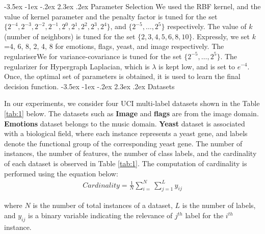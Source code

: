 \documentclass[12pt,a4paper,oneside,english]{report}
\makeatletter
\renewcommand\subsection{\@startsection {subsection}{1}{\z@}%
                                   {-3.5ex \@plus -1ex \@minus -.2ex}%
                                   {2.3ex \@plus.2ex}%
                                   {\centering\normalfont\Large\bfseries}}
\renewcommand{\tabcolsep}{0.5cm}
\renewcommand{\arraystretch}{1.5}
\makeatother
\begin{document}
\subsection{Parameter Selection}
We used the RBF kernel, and the value of kernel parameter and the penalty factor is tuned for the set $\{2^{-4},2^{-3},2^{-2},2^{-1},2^0,2^1,2^2,2^3,2^4\}$, and $\{2^{-5},\ldots,2^5\}$ respectively. The value of $k$ (number of neighbors) is tuned for the set $\{2,3,4,5,6,8,10\}$. Expressly, we set $k$=4, 6, 8, 2, 4, 8 for emotions, flags, yeast, and image  respectively. The regulariserWe for variance-covariance is tuned for the set $\{2^{-5},\ldots,2^5\}$. The regularizer for Hypergraph Laplacian, which is $\lambda$ is kept low, and is set to $e^{-4}$. Once, the optimal set of parameters is obtained, it is used to learn the final decision function.
 \subsection{Datasets}

In our experiments, we consider four UCI multi-label datasets shown in the Table \ref{tab:1} below. The datasets such as \textbf{Image} and \textbf{flags} are from the image domain. \textbf{Emotions} dataset belongs to the music domain. \textbf{Yeast} dataset is associated with a biological field, where each instance represents a yeast gene, and labels denote the functional group of the corresponding yeast gene.  The number of instances, the number of features, the number of class labels, and the cardinality of each dataset is observed in Table \ref{tab:1}. 
The computation of cardinality is performed using the equation below:\\
\begin{eqnarray}
Cardinality = \frac{1}{N}\sum^N_{i=}\sum^L_{j=1}y_{ij} 
\end{eqnarray}  \label{qpp3}

where $N$ is the number of total instances of a dataset, $L$ is the number of labels, and $y_{ij}$ is a binary variable indicating the relevance of $j^{th}$ label for the $i^{th}$ instance.


\setlength{\tabcolsep}{5pt} %
\renewcommand{\arraystretch}{1} %
\end{document}
